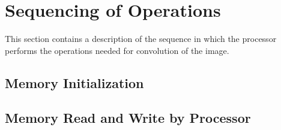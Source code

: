 \documentclass[11pt,a4paper]{article}
\begin{document}
\FloatBarrier
\section{Sequencing of Operations}
\label{sec:sequencing}

This section contains a description of the sequence in which the processor performs the operations needed for convolution of the image. 

\subsection{Memory Initialization}


\subsection{Memory Read and Write by Processor}
\label{sec:memreadwrite}
\end{document}
